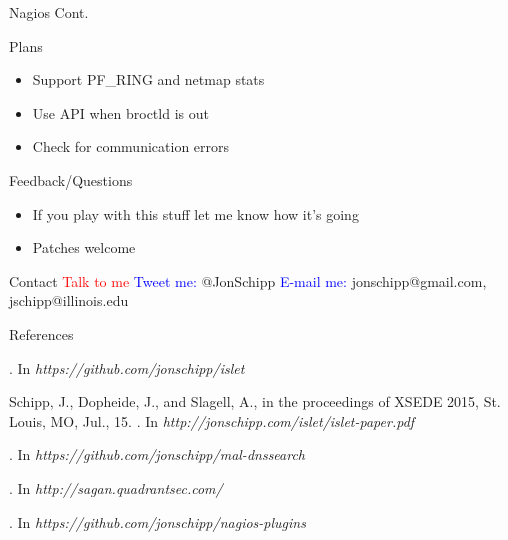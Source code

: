 \documentclass[xcolor=svgnames,handout]{beamer}
\begin{document}
\begin{frame}{Nagios Cont.}
  \begin{block}{Plans}
    \begin{itemize}
      \item Support PF\_RING and netmap stats
      \item Use API when broctld is out
      \item Check for communication errors
    \end{itemize}
  \end{block}
\end{frame}

\begin{frame}{Feedback/Questions}
  \begin{itemize}
    \item If you play with this stuff let me know how it's going
    \item Patches welcome
  \end{itemize}
  \begin{exampleblock}{Contact}
  \textcolor{red}{Talk to me} \newline
  \textcolor{blue}{Tweet  me:} @JonSchipp \newline
  \textcolor{blue}{E-mail me:} jonschipp@gmail.com, jschipp@illinois.edu \newline
  \end{exampleblock}
\end{frame}

\begin{frame}[allowframebreaks]{References}
\begin{thebibliography}{1}

.
\newblock In {\em https://github.com/jonschipp/islet}

Schipp, J., Dopheide, J., and Slagell, A., in the proceedings of XSEDE 2015, St.  Louis, MO, Jul., 15.
.
\newblock In {\em http://jonschipp.com/islet/islet-paper.pdf}

.
\newblock In {\em https://github.com/jonschipp/mal-dnssearch}

.
\newblock In {\em http://sagan.quadrantsec.com/}

.
\newblock In {\em https://github.com/jonschipp/nagios-plugins}

\end{thebibliography}
\end{frame}
\end{document}
